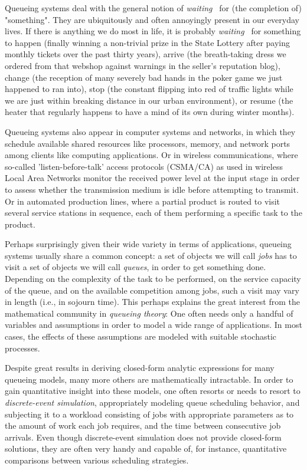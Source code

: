 Queueing systems deal with the general notion of {\em waiting\ }
  for (the completion of) "something".
They are ubiquitously and often annoyingly present in our everyday lives.
If there is anything we do most in life,
  it is probably {\em waiting\ } for something to
  happen (finally winning a non-trivial prize in the State Lottery
          after paying monthly tickets over the past thirty years),
  arrive (the breath-taking dress we ordered from that webshop
          against warnings in the seller's reputation blog),
  change (the reception of many severely bad hands in the poker game
          we just happened to ran into),
  stop (the constant flipping into red of traffic lights
        while we are just within breaking distance
        in our urban environment),
  or
  resume (the heater that regularly happens to have
          a mind of its own during
          winter months).

Queueing systems also appear in computer systems and networks,
  in which they schedule available shared resources
  like processors, memory, and network ports
  among clients like
  computing applications.
Or in wireless communications,
  where so-called 'listen-before-talk'
  access protocols (CSMA/CA) as used in wireless Local Area Networks
  monitor the received power level at the input stage
  in order to assess whether the
  transmission medium is idle
  before attempting to transmit.
Or in automated production lines,
  where a partial product is routed to visit
  several service stations in sequence,
  each of them performing a specific task to the
  product.

Perhaps surprisingly given their wide variety in terms of applications,
  queueing systems usually share a common concept:
  a set of objects we will call {\em jobs\/}
  has to visit a set of objects we will call {\em queues},
  in order to get something done.
Depending on the complexity of the task to be performed,
  on the service capacity of the queue,
  and on the available competition among jobs,
  such a visit may vary in length (i.e., in sojourn time).
This perhaps explains the great interest from the mathematical community
  in {\em queueing theory\/}:
  One often needs only a handful of variables and assumptions
    in order to model a wide range of applications.
In most cases,
  the effects of these assumptions
  are modeled with
  suitable stochastic processes.

Despite great results in deriving closed-form analytic expressions
  for many queueing models,
  many more others are mathematically intractable.
In order to gain quantitative insight into these models,
  one often resorts or needs to resort to {\em discrete-event simulation},
  appropriately modeling queue scheduling behavior,
  and subjecting it to a workload consisting of jobs
  with appropriate parameters
  as to the amount of work each job requires,
  and the time between consecutive job arrivals.
Even though discrete-event simulation
  does not provide closed-form solutions,
  they are often very handy and capable of,
  for instance, quantitative comparisons
  between various scheduling strategies.


